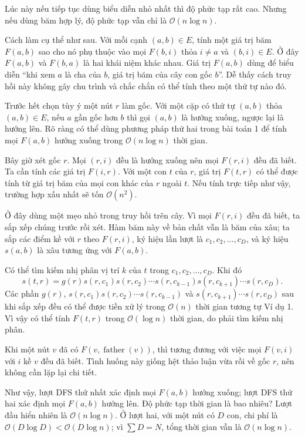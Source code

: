 \documentclass[11pt]{article}
\newcommand{\Oh}{\mathcal{O}}
\begin{document}
Lúc này nếu tiếp tục dùng biểu diễn nhỏ nhất thì độ phức tạp rất cao. Nhưng
nếu dùng băm hợp lý, độ phức tạp vẫn chỉ là $\Oh(n\log n)$.

Cách làm cụ thể như sau. Với mỗi cạnh $(a,b)\in E$, tính một giá trị băm
$F(a,b)$ sao cho nó phụ thuộc vào mọi $F(b,i)$ thỏa $i\ne a$ và $(b,i)\in E$.
Ở đây $F(a,b)$ và $F(b,a)$ là hai khái niệm khác nhau. Giá trị $F(a,b)$ dùng
để biểu diễn ``khi xem $a$ là cha của $b$, giá trị băm của cây con gốc
$b$''. Dễ thấy cách truy hồi này không gây chu trình và chắc chắn có thể tính
theo một thứ tự nào đó.

Trước hết chọn tùy ý một nút $r$ làm gốc. Với một cặp có thứ tự $(a,b)$ thỏa
$(a,b)\in E$, nếu $a$ gần gốc hơn $b$ thì gọi $(a,b)$ là hướng xuống, ngược
lại là hướng lên. Rõ ràng có thể dùng phương pháp thứ hai trong bài toán 1
để tính mọi $F(a,b)$ hướng xuống trong $\Oh(n\log n)$ thời gian.

Bây giờ xét gốc $r$. Mọi $(r,i)$ đều là hướng xuống nên mọi $F(r,i)$ đều đã
biết. Ta cần tính các giá trị $F(i,r)$. Với một con $t$ của $r$, giá trị
$F(t,r)$ có thể được tính từ giá trị băm của mọi con khác của $r$ ngoài $t$.
Nếu tính trực tiếp như vậy, trường hợp xấu nhất sẽ tốn $\Oh(n^2)$.

Ở đây dùng một mẹo nhỏ trong truy hồi trên cây. Vì mọi $F(r,i)$ đều đã biết,
ta sắp xếp chúng trước rồi xét. Hàm băm này về bản chất vẫn là băm của xâu;
ta sắp các điểm kề với $r$ theo $F(r,i)$, ký hiệu lần lượt là
$c_1,c_2,\ldots,c_D$, và ký hiệu $s(a,b)$ là xâu tương ứng với $F(a,b)$.

Có thể tìm kiếm nhị phân vị trí $k$ của $t$ trong
$c_1,c_2,\ldots,c_D$. Khi đó
\[
  s(t,r)=
  g(r)s(r,c_1)s(r,c_2)\cdots s(r,c_{k-1})
  s(r,c_{k+1})\cdots s(r,c_D).
\]
Các phần $g(r)$,
$s(r,c_1)s(r,c_2)\cdots s(r,c_{k-1})$ và
$s(r,c_{k+1})\cdots s(r,c_D)$ sau khi sắp xếp đều có thể được tiền xử lý
trong $\Oh(n)$ thời gian tương tự Ví dụ 1. Vì vậy có thể tính $F(t,r)$ trong
$\Oh(\log n)$ thời gian, do phải tìm kiếm nhị phân.

Khi một nút $v$ đã có $F(v,\operatorname{father}(v))$, thì tương đương với
việc mọi $F(v,i)$ với $i$ kề $v$ đều đã biết. Tình huống này giống hệt thảo
luận vừa rồi về gốc $r$, nên không cần lặp lại chi tiết.

Như vậy, lượt DFS thứ nhất xác định mọi $F(a,b)$ hướng xuống; lượt DFS thứ
hai xác định mọi $F(a,b)$ hướng lên. Độ phức tạp thời gian là bao nhiêu? Lượt
đầu hiển nhiên là $\Oh(n\log n)$. Ở lượt hai, với một nút có $D$ con, chi phí
là $\Oh(D\log D)<\Oh(D\log n)$; vì $\sum D=N$, tổng thời gian vẫn là
$\Oh(n\log n)$.
\end{document}
